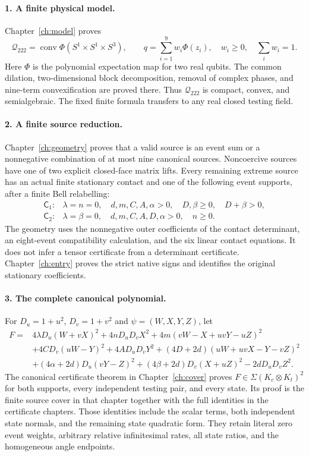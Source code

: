 \paragraph{1. A finite physical model.}
Chapter~\ref{ch:model} proves
\[
 \mathcal Q_{222}
   =\operatorname{conv}\Phi(S^1\times S^1\times S^3),
 \qquad
 q=\sum_{i=1}^{9}w_i\Phi(z_i),\quad
 w_i\geq0,\quad\sum_iw_i=1.
\]
Here $\Phi$ is the polynomial expectation map for two real qubits.
The common dilation, two-dimensional block decomposition, removal of
complex phases, and nine-term convexification are proved there.
Thus $\mathcal Q_{222}$ is compact, convex, and semialgebraic.
The fixed finite formula transfers to any real closed testing field.

\paragraph{2. A finite source reduction.}
Chapter~\ref{ch:geometry} proves that a valid source is an event sum
or a nonnegative combination of at most nine canonical sources.
Noncoercive sources have one of two explicit closed-face matrix lifts.
Every remaining extreme source has an actual finite stationary contact
and one of the following event supports, after a finite Bell relabelling:
\[
\begin{array}{ll}
\mathsf C_1:&\lambda=n=0,\quad d,m,C,A,\alpha>0,
                         \quad D,\beta\geq0,\quad D+\beta>0,\\
\mathsf C_2:&\lambda=\beta=0,\quad d,m,C,A,D,\alpha>0,
                         \quad n\geq0.
\end{array}
\]
The geometry uses the nonnegative outer coefficients of the contact
determinant, an eight-event compatibility calculation, and the six
linear contact equations.  It does not infer a tensor certificate from
a determinant certificate.  Chapter~\ref{ch:entry} proves the strict
native signs and identifies the original stationary coefficients.

\paragraph{3. The complete canonical polynomial.}
For $D_u=1+u^2$, $D_v=1+v^2$ and $\psi=(W,X,Y,Z)$, let
\[
\begin{split}
F={}&4\lambda D_u(W+vX)^2+4nD_uD_vX^2
       +4m(vW-X+uvY-uZ)^2\\
 &+4CD_v(uW-Y)^2+4AD_uD_vY^2
       +(4D+2d)(uW+uvX-Y-vZ)^2\\
 &+(4\alpha+2d)D_u(vY-Z)^2
       +(4\beta+2d)D_v(X+uZ)^2-2dD_uD_vZ^2.
\end{split}                                                     \tag{M1}
\]
The canonical certificate theorem in Chapter~\ref{ch:cover} proves
$F\in\Sigma(K_c\otimes K_t)^2$ for both supports, every independent
testing pair, and every state.  Its proof is the finite source cover
in that chapter together with the full identities in the certificate
chapters.  Those identities include the scalar terms, both independent
state normals, and the remaining state quadratic form.  They retain
literal zero event weights, arbitrary relative infinitesimal rates,
all state ratios, and the homogeneous angle endpoints.

